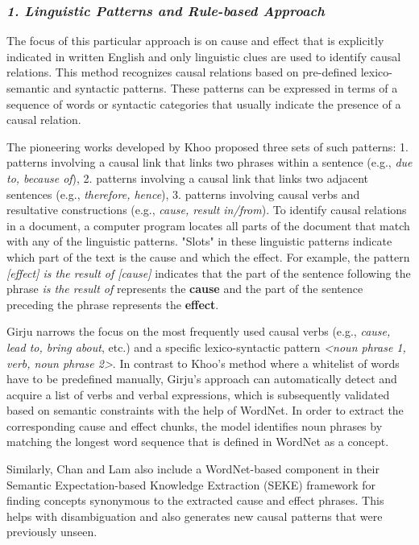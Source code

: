 \subsubsection {\emph{1. Linguistic Patterns and Rule-based Approach}}

The focus of this particular approach is on cause and effect that is explicitly indicated in written English and only linguistic clues are used to identify causal relations. This method recognizes causal relations based on pre-defined lexico-semantic and syntactic patterns. These patterns can be expressed in terms of a sequence of words or syntactic categories that usually indicate the presence of a causal relation. 

The pioneering works developed by Khoo \cite{KhooThesis95,Khoo98,Khoo01} proposed three sets of such patterns: 1. patterns involving a causal link that links two phrases within a sentence (e.g., \emph{due to, because of}), 2. patterns involving a causal link that links two adjacent sentences (e.g., \emph{therefore, hence}), 3. patterns involving causal verbs and resultative constructions (e.g., \emph{cause, result in/from}). To identify causal relations in a document, a computer program locates all parts of the document that match with any of the linguistic patterns. "Slots" in these linguistic patterns indicate which part of the text is the cause and which the effect. For example, the pattern \emph{[effect] is the result of [cause]} indicates that the part of the sentence following the phrase \emph{is the result of} represents the \textbf{cause} and the part of the sentence preceding the phrase represents the \textbf{effect}.

Girju \cite{Girju02, Girju03} narrows the focus on the most frequently used causal verbs (e.g., \emph{cause, lead to, bring about}, etc.) and a specific lexico-syntactic pattern \emph{<noun phrase 1, verb, noun phrase 2>}. In contrast to Khoo's method where a whitelist of words have to be predefined manually, Girju's approach can automatically detect and acquire a list of verbs and verbal expressions, which is subsequently validated based on semantic constraints with the help of WordNet. In order to extract the corresponding cause and effect chunks, the model identifies noun phrases by matching the longest word sequence that is defined in WordNet as a concept. 

Similarly, Chan and Lam \cite{SEKE05} also include a WordNet-based component in their Semantic Expectation-based Knowledge Extraction (SEKE) framework for finding concepts synonymous to the extracted cause and effect phrases. This helps with disambiguation and also generates new causal patterns that were previously unseen. 

